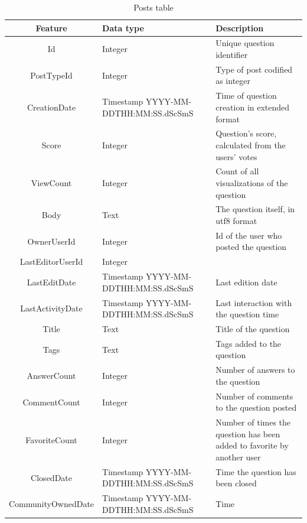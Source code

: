 \documentclass[11pt]{article} %
\begin{document}
      \begin{table}[!h]
        \centering
        \begin{tabular}{|c|p{}|p{}|}
          \hline

          Feature & Data type & Description \\ \hline
          Id & Integer & Unique question identifier \\ \hline
          PostTypeId & Integer & Type of post codified as integer \\ \hline
          CreationDate & Timestamp YYYY-MM-DDTHH:MM:SS.dScSmS & Time of question creation in extended format \\ \hline
          Score & Integer & Question's score, calculated from the users' votes \\ \hline
          ViewCount & Integer & Count of all visualizations of the question \\ \hline
          Body & Text & The question itself, in utf8 format \\ \hline
          OwnerUserId & Integer & Id of the user who posted the question \\ \hline
          LastEditorUserId & Integer & \\ \hline
          LastEditDate & Timestamp YYYY-MM-DDTHH:MM:SS.dScSmS & Last edition date \\ \hline
          LastActivityDate & Timestamp YYYY-MM-DDTHH:MM:SS.dScSmS & Last interaction with the question time \\ \hline
          Title & Text & Title of the question \\ \hline
          Tags & Text & Tags added to the question \\ \hline
          AnswerCount & Integer & Number of answers to the question \\ \hline
          CommentCount & Integer & Number of comments to the question posted \\ \hline
          FavoriteCount & Integer & Number of times the question has been added to favorite by another user \\ \hline
          ClosedDate & Timestamp YYYY-MM-DDTHH:MM:SS.dScSmS & Time the question has been closed \\ \hline
          CommunityOwnedDate & Timestamp YYYY-MM-DDTHH:MM:SS.dScSmS & Time \\

          \hline
        \end{tabular}
        \caption{Posts table}
        \label{tab:posts}
      \end{table}
\end{document}

